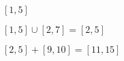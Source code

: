 \begin{frame}
\begin{center}
\Huge $[1,5]$
\end{center}
\end{frame}


\begin{frame}
\begin{center}
\Huge $[1, 5] \cup [2, 7] = [2,5]$

\pnl

\Huge $[2,5] + [9,10] = [11,15]$
\end{center}
\end{frame}



